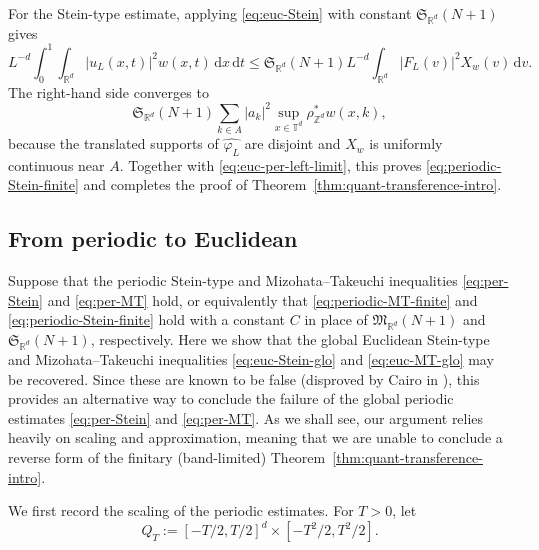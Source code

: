 \documentclass[10pt,a4paper]{amsart}
\numberwithin{equation}{section}
\newcommand{\dd}{\,\mathrm{d}}
\renewcommand{\leq}{\leqslant}
\begin{document}
For the Stein-type estimate, applying \eqref{eq:euc-Stein} with constant $\mathfrak{S}_{\mathbb{R}^d}(N+1)$ gives
\[ L^{-d}\int_0^1\int_{\mathbb{R}^d}|u_L(x,t)|^2w(x,t)\dd x\dd t
\leq \mathfrak{S}_{\mathbb{R}^d}(N+1)L^{-d}\int_{\mathbb{R}^d}|F_L(v)|^2X_w(v)\dd v. \]
The right-hand side converges to
\[ \mathfrak{S}_{\mathbb{R}^d}(N+1)
\sum_{k\in A}|a_k|^2\sup_{x\in\mathbb{T}^d}\rho^{\ast}_{\mathbb{Z}^d}w(x,k), \]
because the translated supports of $\widehat{\varphi_L}$ are disjoint and $X_w$ is uniformly continuous near $A$. Together with \eqref{eq:euc-per-left-limit}, this proves \eqref{eq:periodic-Stein-finite} and completes the proof of Theorem~\ref{thm:quant-transference-intro}.

\subsection{From periodic to Euclidean}\label{Sect:pertoEuc}
Suppose that the periodic Stein-type and Mizohata--Takeuchi inequalities \eqref{eq:per-Stein} and \eqref{eq:per-MT} hold, or equivalently that  \eqref{eq:periodic-MT-finite} and \eqref{eq:periodic-Stein-finite} hold with a constant $C$ in place of $\mathfrak{M}_{\mathbb{R}^d}(N+1)$ and $\mathfrak{S}_{\mathbb{R}^d}(N+1)$, respectively. Here we show that the global Euclidean Stein-type and Mizohata--Takeuchi inequalities \eqref{eq:euc-Stein-glo} and \eqref{eq:euc-MT-glo} may be recovered. Since these are known to be false (disproved by Cairo in \cite{Cairo}), this provides an alternative way to conclude the failure of the global periodic estimates \eqref{eq:per-Stein} and \eqref{eq:per-MT}. As we shall see, our argument relies heavily on scaling and approximation, meaning that we are unable to conclude a reverse form of the finitary (band-limited) Theorem~\ref{thm:quant-transference-intro}. 

We first record the scaling of the periodic estimates. For $T>0$, let
\[ Q_T:=[-T/2,T/2]^d\times[-T^2/2,T^2/2]. \]
\end{document}

